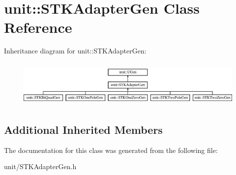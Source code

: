 \hypertarget{classunit_1_1STKAdapterGen}{}\section{unit\+:\+:S\+T\+K\+Adapter\+Gen Class Reference}
\label{classunit_1_1STKAdapterGen}
Inheritance diagram for unit\+:\+:S\+T\+K\+Adapter\+Gen\+:\begin{figure}[H]
\begin{center}
\leavevmode
\includegraphics[height=2.333333cm]{classunit_1_1STKAdapterGen}
\end{center}
\end{figure}
\subsection*{Additional Inherited Members}


The documentation for this class was generated from the following file\+:\begin{DoxyCompactItemize}
\item 
unit/S\+T\+K\+Adapter\+Gen.\+h\end{DoxyCompactItemize}

